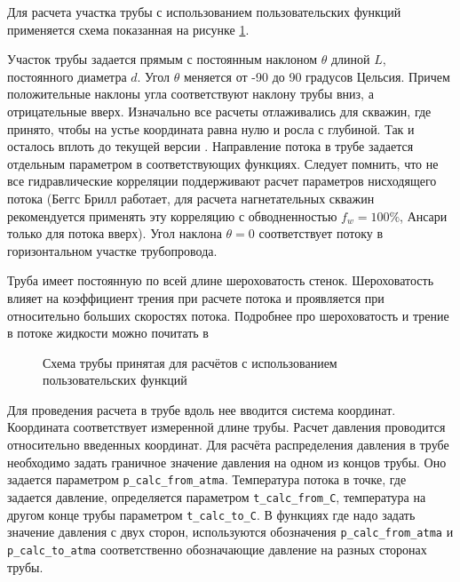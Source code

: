 Для расчета участка трубы с использованием пользовательских функций \unf{} применяется схема показанная на рисунке \ref{ris:Pipe_scheme_1}.

Участок трубы задается прямым с постоянным наклоном $\theta$  длиной $L$, постоянного диаметра $d$. Угол  $\theta$ меняется от -90 до 90 градусов Цельсия. Причем положительные наклоны угла соответствуют наклону трубы вниз, а отрицательные вверх. Изначально все расчеты отлаживались для скважин, где принято, чтобы на устье координата равна нулю и росла с глубиной. Так и осталось вплоть до текущей версии \unf{}.  Направление потока в трубе задается отдельным параметром в соответствующих функциях. Следует помнить, что не все гидравлические корреляции поддерживают расчет параметров нисходящего потока (Беггс Брилл работает, для расчета нагнетательных скважин рекомендуется применять эту корреляцию с обводненностью $f_w = 100\% $, Ансари только для потока вверх). Угол наклона $\theta = 0 $ соответствует потоку в горизонтальном участке трубопровода.

Труба имеет постоянную по всей длине шероховатость стенок. Шероховатость влияет на коэффициент трения при расчете потока и проявляется при относительно больших скоростях потока. Подробнее про шероховатость и трение в потоке жидкости можно почитать в \cite{Bratland_Pipe_Flow_1}

\begin{figure}[H]
	\begin{center}
		
		\caption{Схема трубы принятая для расчётов с использованием пользовательских функций}
		\label{ris:Pipe_scheme_1}
	\end{center}
\end{figure}

Для проведения расчета в трубе вдоль нее вводится система координат. Координата соответствует измеренной длине трубы. Расчет давления проводится относительно введенных координат. 
Для расчёта распределения давления в трубе необходимо задать граничное значение давления на одном из концов трубы. Оно задается параметром  \texttt{p_calc_from_atma}. Температура потока в точке, где задается давление, определяется параметром  \texttt{t_calc_from_C}, температура на другом конце трубы  параметром \texttt{t_calc_to_C}.  В функциях где надо задать значение давления с двух сторон, используются обозначения \texttt{p_calc_from_atma} и \texttt{p_calc_to_atma} соответственно обозначающие давление на разных сторонах трубы. 



